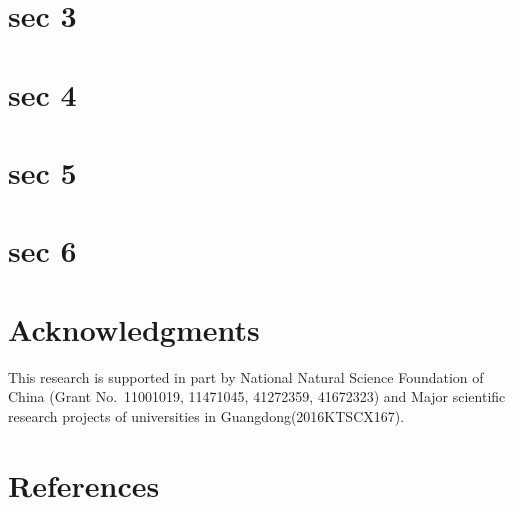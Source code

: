 \documentclass[preprint,12pt,authoryear]{elsarticle}
\begin{document}
\section{sec 3}
\label{sec:3}

\section{sec 4}
\label{sec:4}

\section{sec 5}
\label{sec:5}

\section{sec 6}
\label{sec:6}

\section*{Acknowledgments}
This research is supported in part by National Natural Science Foundation of China (Grant No.~11001019, 11471045, 41272359, 41672323) and Major scientific research projects of universities in Guangdong(2016KTSCX167).



\section*{References}

\end{document}

